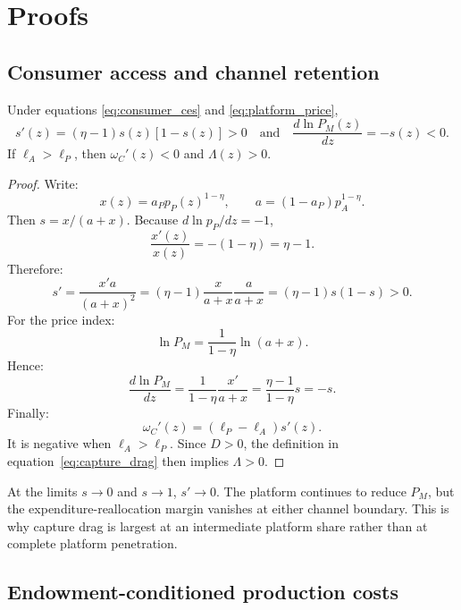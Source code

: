 \section{Proofs}

\subsection{Consumer access and channel retention}

\begin{lemma}
\label{lem:consumer}
Under equations \eqref{eq:consumer_ces} and \eqref{eq:platform_price},
\[
s'(z)=(\eta-1)s(z)[1-s(z)]>0
\quad\text{and}\quad
\frac{d\ln P_M(z)}{dz}=-s(z)<0.
\]
If \(\ell_A>\ell_P\), then \(\omega_C'(z)<0\) and
\(\Lambda(z)>0\).
\end{lemma}

\begin{proof}
Write:
\[
x(z)=a_Pp_P(z)^{1-\eta},
\qquad
a=(1-a_P)p_A^{1-\eta}.
\]
Then \(s=x/(a+x)\).  Because \(d\ln p_P/dz=-1\),
\[
\frac{x'(z)}{x(z)}=-(1-\eta)=\eta-1.
\]
Therefore:
\[
s'
=\frac{x'a}{(a+x)^2}
=(\eta-1)\frac{x}{a+x}\frac{a}{a+x}
=(\eta-1)s(1-s)>0.
\]
For the price index:
\[
\ln P_M=\frac{1}{1-\eta}\ln(a+x).
\]
Hence:
\[
\frac{d\ln P_M}{dz}
=\frac{1}{1-\eta}\frac{x'}{a+x}
=\frac{\eta-1}{1-\eta}s
=-s.
\]
Finally:
\[
\omega_C'(z)=(\ell_P-\ell_A)s'(z).
\]
It is negative when \(\ell_A>\ell_P\).  Since \(D>0\), the definition in
equation~\eqref{eq:capture_drag} then implies \(\Lambda>0\).
\end{proof}

At the limits \(s\rightarrow0\) and \(s\rightarrow1\), \(s'\rightarrow0\).
The platform continues to reduce \(P_M\), but the expenditure-reallocation
margin vanishes at either channel boundary.  This is why capture drag is
largest at an intermediate platform share rather than at complete platform
penetration.

\subsection{Endowment-conditioned production costs}

